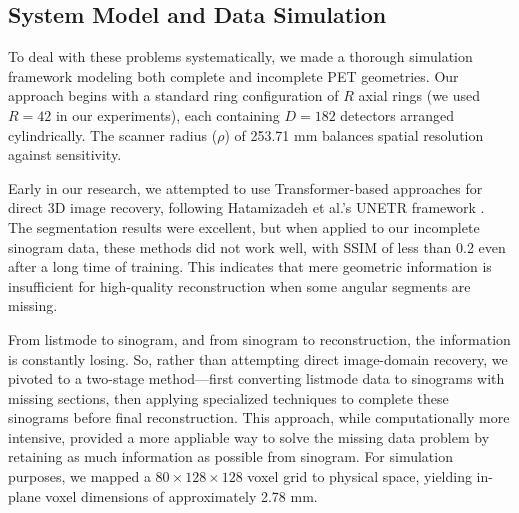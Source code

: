 \documentclass[12pt]{iopart}
\begin{document}
\subsection{System Model and Data Simulation}

To deal with these problems systematically, we made a thorough simulation framework modeling both complete and incomplete PET geometries. Our approach begins with a standard ring configuration of $R$ axial rings (we used $R=42$ in our experiments), each containing $D=182$ detectors arranged cylindrically. The scanner radius ($\rho$) of 253.71 mm balances spatial resolution against sensitivity.

Early in our research, we attempted to use Transformer-based approaches for direct 3D image recovery, following Hatamizadeh et al.'s UNETR framework \cite{hatamizadeh2021unetrtransformers3dmedical}. The segmentation results were excellent, but when applied to our incomplete sinogram data, these methods did not work well, with SSIM of less than 0.2 even after a long time of training. This indicates that mere geometric information is insufficient for high-quality reconstruction when some angular segments are missing. 



From listmode to sinogram, and from sinogram to reconstruction, the information is constantly losing. So, rather than attempting direct image-domain recovery, we pivoted to a two-stage method—first converting listmode data to sinograms with missing sections, then applying specialized techniques to complete these sinograms before final reconstruction. This approach, while computationally more intensive, provided a more appliable way to solve the missing data problem by retaining as much information as possible from sinogram.
For simulation purposes, we mapped a $80\times128\times128$ voxel grid to physical space, yielding in-plane voxel dimensions of approximately 2.78 mm.

\end{document}
